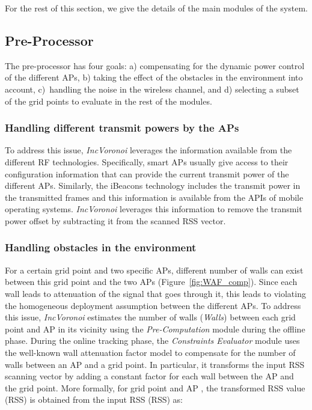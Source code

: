 \documentclass[conference]{IEEEtran}
\def \sys {\textit{IncVoronoi}}
\begin{document}
For the rest of this section, we give the details of the main modules of the system.

\subsection{Pre-Processor}
The pre-processor has four goals: a) compensating for the dynamic power control of the different APs, b) taking the effect of the obstacles in the environment into account, c)~handling the noise in the wireless channel, and d) selecting a subset of the grid points to evaluate in the rest of the modules.

\subsubsection{Handling different transmit powers by the APs}
 To address this issue, \sys{} leverages the information available from the different RF technologies. Specifically, smart APs usually give access to their configuration information that can provide the current transmit power of the different APs. Similarly, the iBeacons technology includes the transmit power in the transmitted frames and this information is available from the APIs of mobile operating systems. \sys{} leverages this information to remove the transmit power offset by subtracting it from the scanned RSS vector.

\subsubsection{Handling obstacles in the environment}\label{sec:waf}
For a certain grid point and two specific APs, different number of walls can exist between this grid point and the two APs (Figure~\ref{fig:WAF_comp}). Since each wall leads to attenuation of the signal that goes through it, this leads to violating the homogeneous deployment assumption between the different APs. To address this issue, \sys{} estimates the number of walls (\emph{Walls}) between each grid point  and AP  in its vicinity using the \emph{Pre-Computation} module during the offline phase. During the online tracking phase, the \emph{Constraints Evaluator} module uses the well-known wall attenuation factor model \cite{RADAR00} to compensate for the number of walls between an AP and a grid point. In particular, it transforms the input RSS scanning vector  by adding a constant factor for each wall between the AP and the grid point. More formally, for grid point  and AP , the transformed RSS value (RSS) is obtained from the input RSS (RSS) as:
\end{document}
